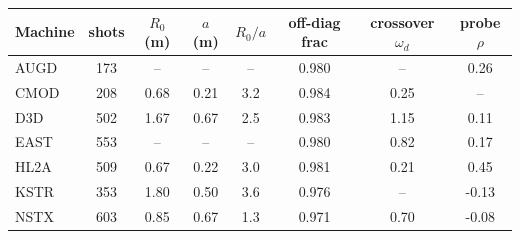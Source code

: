 \begin{tabular}{lccccccc}
\toprule
Machine & shots & $R_0$(m) & $a$(m) & $R_0/a$ & off-diag frac & crossover $\omega_d$ & probe $\rho$ \\
\midrule
AUGD & 173 & -- & -- & -- & 0.980 & -- & 0.26 \\
CMOD & 208 & 0.68 & 0.21 & 3.2 & 0.984 & 0.25 & -- \\
D3D & 502 & 1.67 & 0.67 & 2.5 & 0.983 & 1.15 & 0.11 \\
EAST & 553 & -- & -- & -- & 0.980 & 0.82 & 0.17 \\
HL2A & 509 & 0.67 & 0.22 & 3.0 & 0.981 & 0.21 & 0.45 \\
KSTR & 353 & 1.80 & 0.50 & 3.6 & 0.976 & -- & -0.13 \\
NSTX & 603 & 0.85 & 0.67 & 1.3 & 0.971 & 0.70 & -0.08 \\
\bottomrule
\end{tabular}
